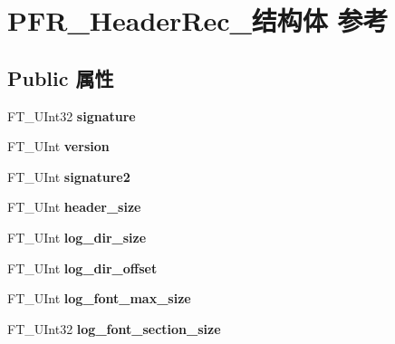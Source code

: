 \hypertarget{struct_p_f_r___header_rec__}{}\section{P\+F\+R\+\_\+\+Header\+Rec\+\_\+结构体 参考}
\label{struct_p_f_r___header_rec__}
\subsection*{Public 属性}
\begin{DoxyCompactItemize}
\item 
\mbox{\label{struct_p_f_r___header_rec___a502bea0985013e23b982e8789547e958}} 
F\+T\+\_\+\+U\+Int32 {\bfseries signature}
\item 
\mbox{\label{struct_p_f_r___header_rec___a71a2ac357e975d39c1831e64dd080224}} 
F\+T\+\_\+\+U\+Int {\bfseries version}
\item 
\mbox{\label{struct_p_f_r___header_rec___af9b5d58adb7f3ea8bf471c48b358865c}} 
F\+T\+\_\+\+U\+Int {\bfseries signature2}
\item 
\mbox{\label{struct_p_f_r___header_rec___a52c0223534cefbb4f5c577fa2b9dbcd7}} 
F\+T\+\_\+\+U\+Int {\bfseries header\+\_\+size}
\item 
\mbox{\label{struct_p_f_r___header_rec___aedeb437f7c3ddb0021952662edd8b7ec}} 
F\+T\+\_\+\+U\+Int {\bfseries log\+\_\+dir\+\_\+size}
\item 
\mbox{\label{struct_p_f_r___header_rec___ad0aa4fd5f5d9503db9ab00fa549dd3e5}} 
F\+T\+\_\+\+U\+Int {\bfseries log\+\_\+dir\+\_\+offset}
\item 
\mbox{\label{struct_p_f_r___header_rec___a35d14dd3f3f4d43179eb539b9b3850bf}} 
F\+T\+\_\+\+U\+Int {\bfseries log\+\_\+font\+\_\+max\+\_\+size}
\item 
\mbox{\label{struct_p_f_r___header_rec___a4d37f0630949ce4821cc229efced289a}} 
F\+T\+\_\+\+U\+Int32 {\bfseries log\+\_\+font\+\_\+section\+\_\+size}

\end{DoxyCompactItemize}
